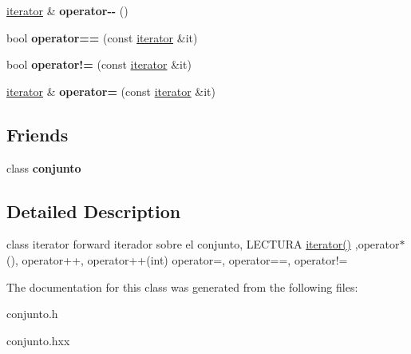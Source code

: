 \begin{DoxyCompactItemize}
\item 
\hypertarget{classconjunto_1_1iterator_a63d117e509415fdef76bf6504d3bde50}{\hyperlink{classconjunto_1_1iterator}{iterator} \& {\bfseries operator-\/-\/} ()}\label{classconjunto_1_1iterator_a63d117e509415fdef76bf6504d3bde50}

\item 
\hypertarget{classconjunto_1_1iterator_a771856bc966ec46b19f4756592cb084c}{bool {\bfseries operator==} (const \hyperlink{classconjunto_1_1iterator}{iterator} \&it)}\label{classconjunto_1_1iterator_a771856bc966ec46b19f4756592cb084c}

\item 
\hypertarget{classconjunto_1_1iterator_a50fefbd7759c9faedbcd814050dc7191}{bool {\bfseries operator!=} (const \hyperlink{classconjunto_1_1iterator}{iterator} \&it)}\label{classconjunto_1_1iterator_a50fefbd7759c9faedbcd814050dc7191}

\item 
\hypertarget{classconjunto_1_1iterator_a1dd1795a05ff0665e32217ad3aa2fd61}{\hyperlink{classconjunto_1_1iterator}{iterator} \& {\bfseries operator=} (const \hyperlink{classconjunto_1_1iterator}{iterator} \&it)}\label{classconjunto_1_1iterator_a1dd1795a05ff0665e32217ad3aa2fd61}

\end{DoxyCompactItemize}
\subsection*{Friends}
\begin{DoxyCompactItemize}
\item 
\hypertarget{classconjunto_1_1iterator_a42fdcda39c77eabd7380e29fcdbe5dd2}{class {\bfseries conjunto}}\label{classconjunto_1_1iterator_a42fdcda39c77eabd7380e29fcdbe5dd2}

\end{DoxyCompactItemize}


\subsection{Detailed Description}
class iterator forward iterador sobre el conjunto, L\-E\-C\-T\-U\-R\-A \hyperlink{classconjunto_1_1iterator_ae3ade272e78f6888c39ad44a8b4b152a}{iterator()} ,operator$\ast$(), operator++, operator++(int) operator=, operator==, operator!= 

The documentation for this class was generated from the following files\-:\begin{DoxyCompactItemize}
\item 
conjunto.\-h\item 
conjunto.\-hxx\end{DoxyCompactItemize}
